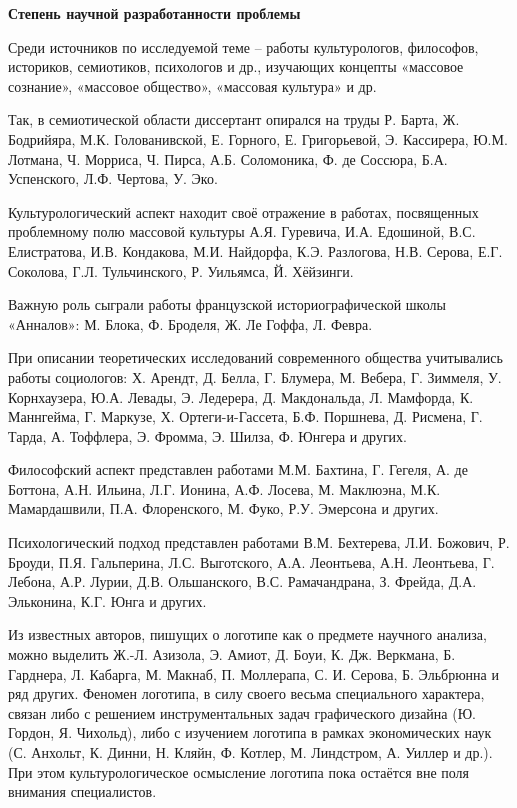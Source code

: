 \textbf{Степень научной разработанности проблемы} 

Среди источников по исследуемой теме – работы культурологов, философов, историков, семиотиков, психологов и др., изучающих концепты «массовое сознание», «массовое общество», «массовая культура» и др.

Так, в семиотической области диссертант опирался на труды Р. Барта, Ж. Бодрийяра, М.К. Голованивской, Е. Горного, Е. Григорьевой, Э. Кассирера, Ю.М. Лотмана, Ч. Морриса, Ч. Пирса, А.Б. Соломоника, Ф. де Соссюра, Б.А. Успенского, Л.Ф. Чертова, У. Эко.

Культурологический аспект находит своё отражение в работах, посвященных проблемному полю массовой культуры А.Я. Гуревича, И.А. Едошиной, В.С. Елистратова, И.В. Кондакова, М.И. Найдорфа, К.Э. Разлогова, Н.В. Серова, Е.Г. Соколова, Г.Л. Тульчинского, Р. Уильямса, Й. Хёйзинги.

Важную роль сыграли работы французской историографической школы «Анналов»: М. Блока, Ф. Броделя, Ж. Ле Гоффа, Л. Февра.

При описании теоретических исследований современного общества учитывались работы социологов: Х. Арендт, Д. Белла, Г. Блумера, М. Вебера, Г. Зиммеля, У. Корнхаузера, Ю.А. Левады, Э. Ледерера, Д. Макдональда, Л. Мамфорда, К. Маннгейма, Г. Маркузе, Х. Ортеги-и-Гассета, Б.Ф. Поршнева, Д. Рисмена, Г. Тарда, А. Тоффлера, Э. Фромма, Э. Шилза, Ф. Юнгера и других.

Философский аспект представлен работами М.М. Бахтина, Г. Гегеля, А. де Боттона, А.Н. Ильина, Л.Г. Ионина, А.Ф. Лосева, М. Маклюэна, М.К. Мамардашвили, П.А. Флоренского, М. Фуко, Р.У. Эмерсона и других.

Психологический подход представлен работами В.М. Бехтерева, Л.И. Божович, Р. Броуди, П.Я. Гальперина, Л.С. Выготского, А.А. Леонтьева, А.Н. Леонтьева, Г. Лебона, А.Р. Лурии, Д.В. Ольшанского, В.С. Рамачандрана, З. Фрейда, Д.А. Эльконина, К.Г. Юнга и других.

Из известных авторов, пишущих о логотипе как о предмете научного анализа, можно выделить Ж.-Л. Азизола, Э. Амиот, Д. Боуи, К. Дж. Веркмана, Б. Гарднера, Л. Кабарга, М. Макнаб, П. Моллерапа, С. И. Серова, Б. Эльбрюнна и ряд других. Феномен логотипа, в силу своего весьма специального характера, связан либо с решением инструментальных задач графического дизайна (Ю. Гордон, Я. Чихольд), либо с изучением логотипа в рамках экономических наук (С. Анхольт, К. Динни, Н. Кляйн, Ф. Котлер, М. Линдстром, А. Уиллер и др.). При этом культурологическое осмысление логотипа пока остаётся вне поля внимания специалистов.

